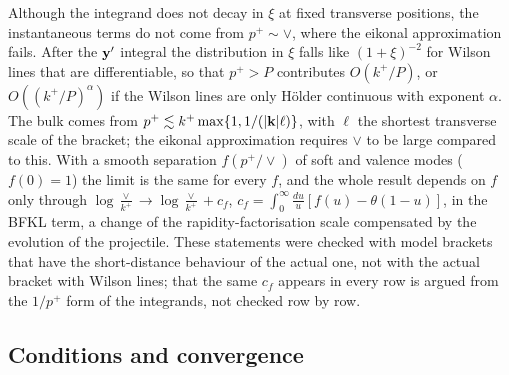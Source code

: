 Although the integrand does not decay in $\xi$ at fixed transverse positions, the instantaneous terms do not come from $p^+\sim\vee$, where the eikonal approximation fails. After the $\mathbf{y}'$ integral the distribution in $\xi$ falls like $(1+\xi)^{-2}$ for Wilson lines that are differentiable, so that $p^+>P$ contributes $O(k^+/P)$, or $O((k^+/P)^\alpha)$ if the Wilson lines are only H\"older continuous with exponent $\alpha$. The bulk comes from $p^+\lesssim k^+\max\{1,1/(|\mathbf{k}|\ell)\}$, with $\ell$ the shortest transverse scale of the bracket; the eikonal approximation requires $\vee$ to be large compared to this. With a smooth separation $f(p^+/\vee)$ of soft and valence modes ($f(0)=1$) the limit is the same for every $f$, and the whole result depends on $f$ only through $\log\frac{\vee}{k^+}\to\log\frac{\vee}{k^+}+c_f$, $c_f=\int_0^\infty\frac{du}{u}[f(u)-\theta(1-u)]$, in the BFKL term, a change of the rapidity-factorisation scale compensated by the evolution of the projectile. These statements were checked with model brackets that have the short-distance behaviour of the actual one, not with the actual bracket with Wilson lines; that the same $c_f$ appears in every row is argued from the $1/p^+$ form of the integrands, not checked row by row.

\subsection{Conditions and convergence}\label{sec:fin_integrable}

